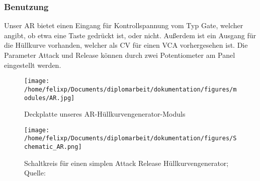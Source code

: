\subsubsection{Benutzung}
\label{sec:org9b4aeea}
Unser AR bietet einen Eingang für Kontrollspannung vom Typ Gate, welcher angibt, ob etwa eine Taste gedrückt ist, oder nicht. Außerdem ist ein Ausgang für die Hüllkurve vorhanden, welcher als \acl{CV} für einen \ac{VCA} vorhergesehen ist. Die Parameter Attack und Release können durch zwei Potentiometer am Panel eingestellt werden.

\begin{figure}[hp]
\centering
\texttt{[image: /home/felixp/Documents/diplomarbeit/dokumentation/figures/modules/AR.jpg]}
\caption{Deckplatte unseres AR-Hüllkurvengenerator-Moduls}
\end{figure}

\begin{figure}[hp]
\centering
\texttt{[image: /home/felixp/Documents/diplomarbeit/dokumentation/figures/Schematic\_AR.png]}
\caption{Schaltkreis für einen simplen Attack Release Hüllkurvengenerator; Quelle: \cite{synthnerd:ar}}
\end{figure}
